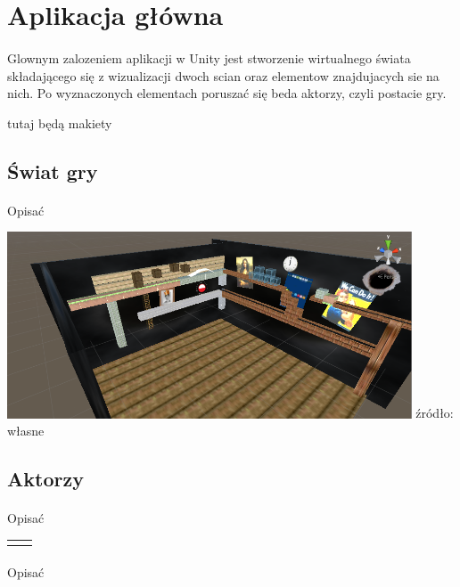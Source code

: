 \newpage
\section{Aplikacja główna}
\paragraph{}
Glownym zalozeniem aplikacji w Unity jest stworzenie wirtualnego świata składającego się z wizualizacji dwoch scian oraz elementow znajdujacych sie na nich. Po wyznaczonych elementach poruszać się beda aktorzy, czyli postacie gry.

{\color{red}tutaj będą makiety}

\subsection{Świat gry}
\paragraph{}
{\color{red}Opisać}

\begin{center}
\includegraphics[width=0.9\textwidth]{images/swiatgry.png}
\small {źródło: własne }
\end{center}


\subsection{Aktorzy}
\paragraph{}
{\color{red}Opisać}


\begin{center}

 \begin{tabular}{|c|c|}
 \hline  
  &   \\
  \hline   
  &   \\
  \hline   
\end{tabular}
\paragraph{}
{\color{red}Opisać}
\end{center}

